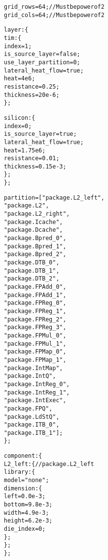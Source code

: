 {\begin{alltt}
            grid_rows = 64; // Must be power of 2
            grid_cols = 64; // Must be power of 2

            layer: \{
                tim: \{
                    index = 1;
                    is_source_layer = false;
                    use_layer_partition = 0;
                    lateral_heat_flow = true;
                    heat = 4e6;
                    resistance = 0.25;
                    thickness = 20e-6;
                \};
                
                silicon: \{
                    index = 0;
                    is_source_layer = true;
                    lateral_heat_flow = true;
                    heat = 1.75e6;
                    resistance = 0.01;
                    thickness = 0.15e-3;
                \};
            \};
            
            partition = ["package.L2_left",
                         "package.L2",
                         "package.L2_right",
                         "package.Icache",
                         "package.Dcache",
                         "package.Bpred_0",
                         "package.Bpred_1",
                         "package.Bpred_2",
                         "package.DTB_0",
                         "package.DTB_1",
                         "package.DTB_2",
                         "package.FPAdd_0",
                         "package.FPAdd_1",
                         "package.FPReg_0",
                         "package.FPReg_1",
                         "package.FPReg_2",
                         "package.FPReg_3",
                         "package.FPMul_0",
                         "package.FPMul_1",
                         "package.FPMap_0",
                         "package.FPMap_1",
                         "package.IntMap",
                         "package.IntQ",
                         "package.IntReg_0",
                         "package.IntReg_1",
                         "package.IntExec",
                         "package.FPQ",
                         "package.LdStQ",
                         "package.ITB_0",
                         "package.ITB_1"];
        \};
        
        component: \{
            L2\_left: \{ // package.L2\_left
                library: \{
                    model = "none";
                    dimension: \{
                        left = 0.0e-3;
                        bottom = 9.8e-3;
                        width = 4.9e-3;
                        height = 6.2e-3;
                        die_index = 0;
                    \};
                \};
            \};
            

\end{alltt}}
